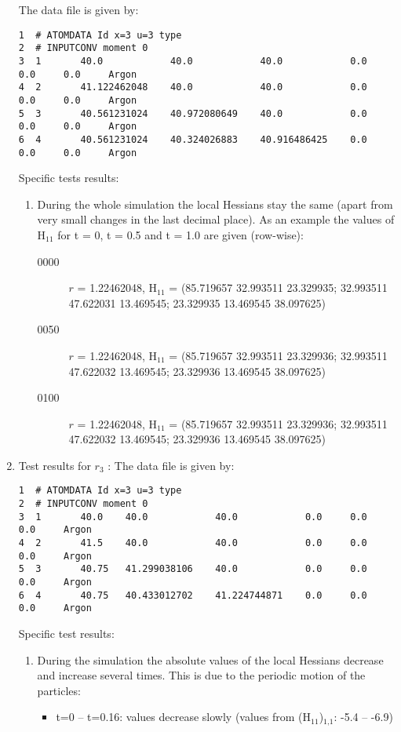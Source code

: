 \documentclass[a4paper]{article}
\begin{document}
\begin{enumerate}
\label{sec-1-6-1-5}
The data file is given by:
\begin{verbatim}
1  # ATOMDATA Id x=3 u=3 type
2  # INPUTCONV moment 0
3  1       40.0            40.0            40.0            0.0     0.0     0.0     Argon
4  2       41.122462048    40.0            40.0            0.0     0.0     0.0     Argon
5  3       40.561231024    40.972080649    40.0            0.0     0.0     0.0     Argon
6  4       40.561231024    40.324026883    40.916486425    0.0     0.0     0.0     Argon
\end{verbatim}
Specific tests results:
\begin{enumerate}
\item During the whole simulation the local Hessians stay the same (apart from very small changes in the last decimal place).
As an example the values of H$_{\text{11}}$ for t = 0, t = 0.5 and t = 1.0 are given (row-wise):
\begin{description}
\item[{0000}] \(r\) = 1.22462048, H$_{\text{11}}$ = (85.719657 32.993511 23.329935; 32.993511 47.622031 13.469545; 23.329935 13.469545 38.097625)
\item[{0050}] \(r\) = 1.22462048, H$_{\text{11}}$ = (85.719657 32.993511 23.329936; 32.993511 47.622032 13.469545; 23.329936 13.469545 38.097625)
\item[{0100}] \(r\) = 1.22462048, H$_{\text{11}}$ = (85.719657 32.993511 23.329936; 32.993511 47.622032 13.469545; 23.329936 13.469545 38.097625)
\end{description}
\end{enumerate}
\item Test results for \(r_3\) :
\label{sec-1-6-1-6}
The data file is given by:
\begin{verbatim}
1  # ATOMDATA Id x=3 u=3 type
2  # INPUTCONV moment 0
3  1       40.0    40.0            40.0            0.0     0.0     0.0     Argon
4  2       41.5    40.0            40.0            0.0     0.0     0.0     Argon
5  3       40.75   41.299038106    40.0            0.0     0.0     0.0     Argon
6  4       40.75   40.433012702    41.224744871    0.0     0.0     0.0     Argon
\end{verbatim}
Specific test results:
\begin{enumerate}
\item During the simulation the absolute values of the local Hessians decrease and increase several times. This is due to the periodic motion of the particles:
\begin{itemize}
\item t=0 -- t=0.16: values decrease slowly (values from (H$_{\text{11}}$)$_{\text{1,1}}$: -5.4 -- -6.9)

\end{itemize}
\end{enumerate}
\end{enumerate}
\end{document}
